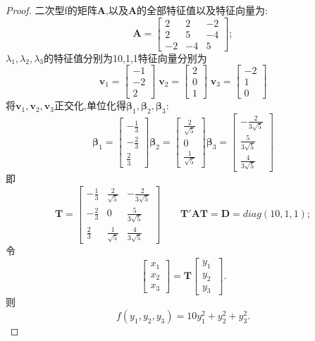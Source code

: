 \documentclass[lang=cn,11pt,normal]{elegantbook}
\begin{document}
	\begin{proof}
		二次型f的矩阵$\boldsymbol{A}$,以及$\boldsymbol{A}$的全部特征值以及特征向量为:
		$$
		\boldsymbol{A}=
		\begin{bmatrix}
		2&2&-2\\
		2&5&-4\\
		-2&-4&5
		\end{bmatrix};
		$$
		$\lambda_1,\lambda_2,\lambda_3$的特征值分别为10,1,1特征向量分别为$$\boldsymbol{v}_1=\begin{bmatrix}-1\\-2\\2\end{bmatrix}\;\boldsymbol{v}_2=\begin{bmatrix}2\\0\\1\end{bmatrix}\;\boldsymbol{v}_3=\begin{bmatrix}-2\\1\\0\end{bmatrix}$$
		将$\boldsymbol{v}_1,\boldsymbol{v}_2,\boldsymbol{v}_3$正交化,单位化得$\boldsymbol{\beta}_1,\boldsymbol{\beta}_2,\boldsymbol{\beta}_3$:
		$$
		\boldsymbol{\beta}_1=
		\begin{bmatrix}
		-\frac{1}{3}\\-\frac{2}{3}\\\frac{2}{3}
		\end{bmatrix}
		\boldsymbol{\beta}_2=
		\begin{bmatrix}
		\frac{2}{\sqrt{5}}\\0\\\frac{1}{\sqrt{5}}
		\end{bmatrix}
		\boldsymbol{\beta}_3=
		\begin{bmatrix}
		-\frac{2}{3\sqrt{5}}\\\frac{5}{3\sqrt{5}}\\\frac{4}{3\sqrt{5}}
		\end{bmatrix}
		$$
		即
		$$
		\boldsymbol{T}=
		\begin{bmatrix}
		-\frac{1}{3}&\frac{2}{\sqrt{5}}&-\frac{2}{3\sqrt{5}}\\
		-\frac{2}{3}&0&\frac{5}{3\sqrt{5}}\\
		\frac{2}{3}&\frac{1}{\sqrt{5}}&\frac{4}{3\sqrt{5}}
		\end{bmatrix}
		\qquad\boldsymbol{T}'\boldsymbol{AT}=\boldsymbol{D}=diag(10,1,1);
		$$
		令
		$$
		\begin{bmatrix}
		x_1\\x_2\\x_3
		\end{bmatrix}
		=
		\boldsymbol{T}
		\begin{bmatrix}
		y_1\\y_2\\y_3\
		\end{bmatrix}.
		$$
		则
		$$f(y_1,y_2,y_3)=10y_1^2+y_2^2+y_3^2.$$
	\end{proof}
\end{document}
